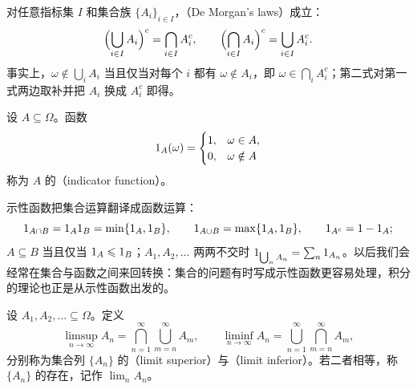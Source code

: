 对任意指标集 $I$ 和集合族 $\{A_i\}_{i\in I}$，（De Morgan's laws）成立：
\[
\Bigl(\bigcup_{i\in I}A_i\Bigr)^c=\bigcap_{i\in I}A_i^c,\qquad \Bigl(\bigcap_{i\in I}A_i\Bigr)^c=\bigcup_{i\in I}A_i^c .
\]
事实上，$\omega\notin\bigcup_iA_i$ 当且仅当对每个 $i$ 都有 $\omega\notin A_i$，即 $\omega\in\bigcap_iA_i^c$；第二式对第一式两边取补并把 $A_i$ 换成 $A_i^c$ 即得。

\begin{definition}[示性函数]\label{def:set-systems:indicator}
设 $A\subseteq\Omega$。函数
\[
1_A(\omega)=\begin{cases}1,&\omega\in A,\\0,&\omega\notin A\end{cases}
\]
称为 $A$ 的（indicator function）。
\end{definition}

示性函数把集合运算翻译成函数运算：
\[
1_{A\cap B}=1_A1_B=\min\{1_A,1_B\},\qquad 1_{A\cup B}=\max\{1_A,1_B\},\qquad 1_{A^c}=1-1_A;
\]
$A\subseteq B$ 当且仅当 $1_A\leqslant1_B$；$A_1,A_2,\dots$ 两两不交时 $1_{\bigcup_nA_n}=\sum_n1_{A_n}$。以后我们会经常在集合与函数之间来回转换：集合的问题有时写成示性函数更容易处理，积分的理论也正是从示性函数出发的。

\begin{definition}[集合列的上极限与下极限]\label{def:set-systems:limsup}
设 $A_1,A_2,\dots\subseteq\Omega$。定义
\[
\limsup_{n\to\infty}A_n=\bigcap_{n=1}^\infty\bigcup_{m=n}^\infty A_m,\qquad
\liminf_{n\to\infty}A_n=\bigcup_{n=1}^\infty\bigcap_{m=n}^\infty A_m,
\]
分别称为集合列 $\{A_n\}$ 的（limit superior）与（limit inferior）。若二者相等，称 $\{A_n\}$ 的存在，记作 $\lim_nA_n$。
\end{definition}

